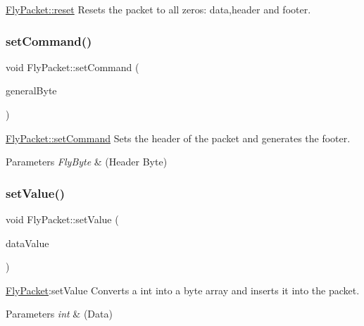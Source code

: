 \hyperlink{class_fly_packet_aaac4cf49c1ef150d0e4e59c2377cedd3}{Fly\+Packet\+::reset} Resets the packet to all zeros\+: data,header and footer. 

\hypertarget{class_fly_packet_aa0693a87a15559c8d88613463805c532}{}\label{class_fly_packet_aa0693a87a15559c8d88613463805c532} 
\subsubsection{\texorpdfstring{set\+Command()}{setCommand()}}
{\footnotesize\ttfamily void Fly\+Packet\+::set\+Command (\begin{DoxyParamCaption}\item[{\hyperlink{conversions_8h_a1f006e31a957accfe6aa1bf6f401efce}{Fly\+Byte}}]{general\+Byte }\end{DoxyParamCaption})}



\hyperlink{class_fly_packet_aa0693a87a15559c8d88613463805c532}{Fly\+Packet\+::set\+Command} Sets the header of the packet and generates the footer. 


\begin{DoxyParams}{Parameters}
{\em Fly\+Byte} & (Header Byte) \\
\hline
\end{DoxyParams}
\hypertarget{class_fly_packet_ab3d6f9ed138f3938dc97a510e050f1dc}{}\label{class_fly_packet_ab3d6f9ed138f3938dc97a510e050f1dc} 
\subsubsection{\texorpdfstring{set\+Value()}{setValue()}\hspace{0.1cm}{\footnotesize\ttfamily [1/2]}}
{\footnotesize\ttfamily void Fly\+Packet\+::set\+Value (\begin{DoxyParamCaption}\item[{int}]{data\+Value }\end{DoxyParamCaption})}



\hyperlink{class_fly_packet}{Fly\+Packet}\+:set\+Value Converts a int into a byte array and inserts it into the packet. 


\begin{DoxyParams}{Parameters}
{\em int} & (Data) \\
\hline
\end{DoxyParams}
\hypertarget{class_fly_packet_a4735fdfc7443640f35b298f5798aab99}{}\label{class_fly_packet_a4735fdfc7443640f35b298f5798aab99} 
